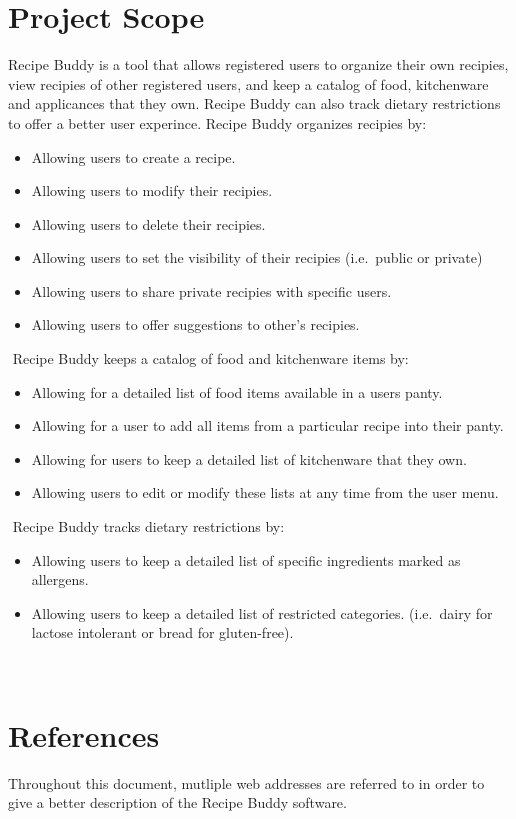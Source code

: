 \documentclass{scrreprt}
\begin{document}
\section{Project Scope}
Recipe Buddy is a tool that allows registered users to organize their own recipies, view recipies of other registered users, and keep a catalog of food, kitchenware and applicances that they own. Recipe Buddy can also track dietary restrictions to offer a better user experince.
$ $Recipe Buddy organizes recipies by:
\begin{itemize}
    \item Allowing users to create a recipe.
    \item Allowing users to modify their recipies.
    \item Allowing users to delete their recipies.
    \item Allowing users to set the visibility of their recipies (i.e.\ public or private)
    \item Allowing users to share private recipies with specific users.
    \item Allowing users to offer suggestions to other's recipies.
\end{itemize}
$ $
$ $Recipe Buddy keeps a catalog of food and kitchenware items by:
\begin{itemize}
    \item Allowing for a detailed list of food items available in a users panty.
    \item Allowing for a user to add all items from a particular recipe into their panty.
    \item Allowing for users to keep a detailed list of kitchenware that they own.
    \item Allowing users to edit or modify these lists at any time from the user menu.
\end{itemize}
$ $
$ $Recipe Buddy tracks dietary restrictions by:
\begin{itemize}
    \item Allowing users to keep a detailed list of specific ingredients marked as allergens.
    \item Allowing users to keep a detailed list of restricted categories. (i.e.\ dairy for lactose intolerant or bread for gluten-free).
\end{itemize}
$ $

\section{References}
Throughout this document, mutliple web addresses are referred to in order to give a better description of the Recipe Buddy software.
\end{document}
